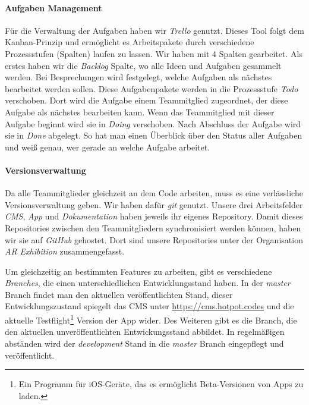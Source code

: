 \documentclass[titlepage, a4paper, 11pt]{scrartcl}
\begin{document}
    \paragraph{Aufgaben Management}
      Für die Verwaltung der Aufgaben haben wir \textit{Trello} genutzt.
      Dieses Tool folgt dem Kanban-Prinzip und ermöglicht es Arbeitspakete durch verschiedene Prozessstufen (Spalten) laufen zu lassen.
      Wir haben mit 4 Spalten gearbeitet. Als erstes haben wir die \textit{Backlog} Spalte, wo alle Ideen und Aufgaben gesammelt werden.
      Bei Besprechungen wird festgelegt, welche Aufgaben als nächstes bearbeitet werden sollen. Diese Aufgabenpakete werden in die Prozessstufe \textit{Todo} verschoben.
      Dort wird die Aufgabe einem Teammitglied zugeordnet, der diese Aufgabe als nächstes bearbeiten kann.
      Wenn das Teammitglied mit dieser Aufgabe beginnt wird sie in \textit{Doing} verschoben.
      Nach Abschluss der Aufgabe wird sie in \textit{Done} abgelegt.
      So hat man einen Überblick über den Status aller Aufgaben und weiß genau, wer gerade an welche Aufgabe arbeitet.
    
    \paragraph{Versionsverwaltung}
      Da alle Teammitglieder gleichzeit an dem Code arbeiten, muss es eine verlässliche Versionsverwaltung geben.
      Wir haben dafür \textit{git} genutzt. Unsere drei Arbeitsfelder \textit{CMS}, \textit{App} und \textit{Dokumentation} haben jeweils ihr eigenes Repository.
      Damit dieses Repositories zwischen den Teammitgliedern synchronisiert werden können, haben wir sie auf \textit{GitHub} gehostet.
      Dort sind unsere Repositories unter der Organisation \textit{AR Exhibition} zusammengefasst.

      Um gleichzeitig an bestimmten Features zu arbeiten, gibt es verschiedene \textit{Branches}, die einen unterschiedlichen Entwicklungsstand haben.
      In der \textit{master} Branch findet man den aktuellen veröffentlichten Stand, dieser Entwicklungszustand spiegelt das CMS unter \url{https://cms.hotpot.codes}
      und die aktuelle Testflight\footnote{Ein Programm für iOS-Geräte, das es ermöglicht Beta-Versionen von Apps zu laden.} Version der App wider.
      Des Weiteren gibt es die  Branch, die den aktuellen unveröffentlichten Entwickungsstand abbildet.
      In regelmäßigen abständen wird der \textit{development} Stand in die \textit{master} Branch eingepflegt und veröffentlicht.
\end{document}
